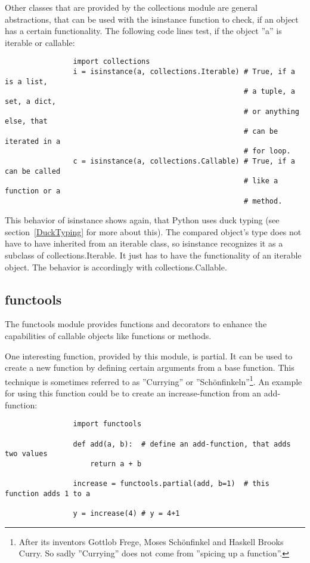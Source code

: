 			Other classes that are provided by the collections module are general abstractions, that can be used with the {\normalfont \ttfamily isinstance} function to check, if an object has a certain functionality.
			The following code lines test, if the object ''{\normalfont \ttfamily a}'' is iterable or callable:
			\begin{verbatim}
				import collections
				i = isinstance(a, collections.Iterable) # True, if a is a list,
				                                        # a tuple, a set, a dict,
				                                        # or anything else, that
				                                        # can be iterated in a
				                                        # for loop.
				c = isinstance(a, collections.Callable) # True, if a can be called
				                                        # like a function or a
				                                        # method.
			\end{verbatim}
			This behavior of {\normalfont \ttfamily isinstance} shows again, that Python uses duck typing (see section~\ref{DuckTyping} for more about this).
			The compared object's type does not have to have inherited from an iterable class, so {\normalfont \ttfamily isinstance} recognizes it as a subclass of {\normalfont \ttfamily collections.Iterable}.
			It just has to have the functionality of an iterable object.
			The behavior is accordingly with {\normalfont \ttfamily collections.Callable}.

		\subsection{functools}
			The functools module provides functions and decorators to enhance the capabilities of callable objects like functions or methods.

			One interesting function, provided by this module, is {\normalfont \ttfamily partial}.
			It can be used to create a new function by defining certain arguments from a base function.
			This technique is sometimes referred to as ''Currying'' or ''Schönfinkeln''\footnote{After its inventors Gottlob Frege, Moses Schönfinkel and Haskell Brooks Curry. So sadly ''Currying'' does not come from ''spicing up a function''.}.
			An example for using this function could be to create an {\normalfont \ttfamily increase}-function from an {\normalfont \ttfamily add}-function:
			\begin{verbatim}
				import functools

				def add(a, b):	# define an add-function, that adds two values
					return a + b

				increase = functools.partial(add, b=1)	# this function adds 1 to a

				y = increase(4)	# y = 4+1
			\end{verbatim}


